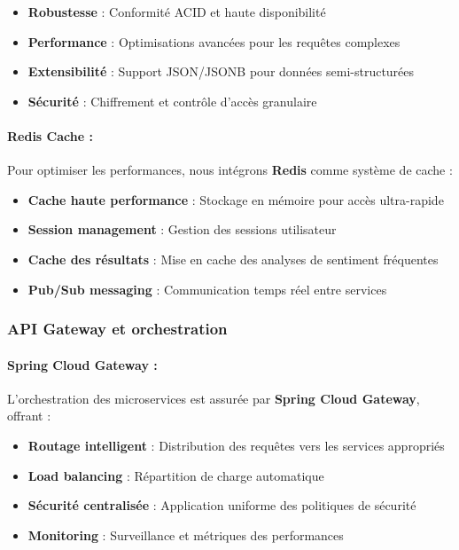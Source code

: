 \begin{itemize}
    \item \textbf{Robustesse} : Conformité ACID et haute disponibilité
    \item \textbf{Performance} : Optimisations avancées pour les requêtes complexes
    \item \textbf{Extensibilité} : Support JSON/JSONB pour données semi-structurées
    \item \textbf{Sécurité} : Chiffrement et contrôle d'accès granulaire
\end{itemize}

\paragraph{Redis Cache :}
Pour optimiser les performances, nous intégrons \textbf{Redis} comme système de cache :

\begin{itemize}
    \item \textbf{Cache haute performance} : Stockage en mémoire pour accès ultra-rapide
    \item \textbf{Session management} : Gestion des sessions utilisateur
    \item \textbf{Cache des résultats} : Mise en cache des analyses de sentiment fréquentes
    \item \textbf{Pub/Sub messaging} : Communication temps réel entre services
\end{itemize}

\subsubsection{API Gateway et orchestration}

\paragraph{Spring Cloud Gateway :}
L'orchestration des microservices est assurée par \textbf{Spring Cloud Gateway}, offrant :

\begin{itemize}
    \item \textbf{Routage intelligent} : Distribution des requêtes vers les services appropriés
    \item \textbf{Load balancing} : Répartition de charge automatique
    \item \textbf{Sécurité centralisée} : Application uniforme des politiques de sécurité
    \item \textbf{Monitoring} : Surveillance et métriques des performances
\end{itemize}

